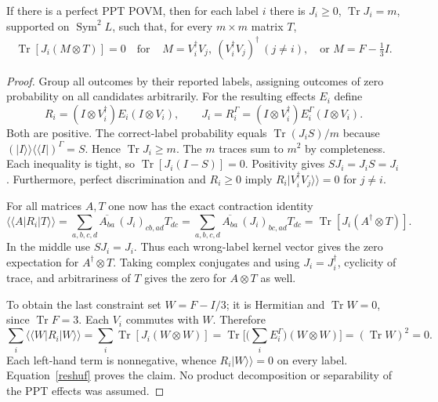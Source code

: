 \documentclass[10pt]{article}
\DeclareMathOperator{\Tr}{Tr}\DeclareMathOperator{\Sym}{Sym}
\begin{document}
\begin{lemma}\label{moment}If there is a perfect PPT POVM, then for each label $i$ there is $J_i\ge0$, $\Tr J_i=m$, supported on $\Sym^2 L$, such that, for every $m\times m$ matrix $T$,
\begin{align}
 \Tr[J_i(M\otimes T)]=0\quad\text{for }&
 M=V_i^\dagger V_j,\ (V_i^\dagger V_j)^\dagger\ (j\ne i),\quad
                 \text{or } M=F-\tfrac13 I . \label{momentconstraints}
\end{align}
\end{lemma}
\begin{proof}Group all outcomes by their reported labels, assigning outcomes of zero probability on all candidates arbitrarily. For the resulting effects $E_i$ define
\[
 R_i=(I\otimes V_i^\dagger)E_i(I\otimes V_i),\qquad
 J_i=R_i^\Gamma=(I\otimes V_i^\dagger)E_i^\Gamma(I\otimes V_i).
\]
Both are positive. The correct-label probability equals $\Tr(J_i S)/m$ because $(|I\rangle\!\rangle\langle\!\langle I|)^\Gamma=S$. Hence $\Tr J_i\ge m$. The $m$ traces sum to $m^2$ by completeness. Each inequality is tight, so $\Tr[J_i(I-S)]=0$. Positivity gives $SJ_i=J_iS=J_i$. Furthermore, perfect discrimination and $R_i\ge0$ imply $R_i|V_i^\dagger V_j\rangle\!\rangle=0$ for $j\ne i$.

For all matrices $A,T$ one now has the exact contraction identity
\begin{equation}
 \langle\!\langle A|R_i|T\rangle\!\rangle
   =\sum_{a,b,c,d}\overline{A_{ba}}\,(J_i)_{cb,ad} T_{dc}
   =\sum_{a,b,c,d}\overline{A_{ba}}\,(J_i)_{bc,ad} T_{dc}
   = \Tr[J_i(A^\dagger\otimes T)]. \label{reshuf}
\end{equation}
In the middle use $SJ_i=J_i$. Thus each wrong-label kernel vector gives the zero expectation for $A^\dagger\otimes T$. Taking complex conjugates and using $J_i=J_i^\dagger$, cyclicity of trace, and arbitrariness of $T$ gives the zero for $A\otimes T$ as well.

To obtain the last constraint set $W=F-I/3$; it is Hermitian and $\Tr W=0$, since $\Tr F=3$. Each $V_i$ commutes with $W$. Therefore
\[
 \sum_i\langle\!\langle W|R_i|W\rangle\!\rangle
 =\sum_i\Tr[J_i(W\otimes W)]
 =\Tr\Big[\Big(\sum_i E_i^\Gamma\Big)(W\otimes W)\Big]
 =(\Tr W)^2=0.
\]
Each left-hand term is nonnegative, whence $R_i|W\rangle\!\rangle=0$ on every label. Equation~\eqref{reshuf} proves the claim. No product decomposition or separability of the PPT effects was assumed.
\end{proof}
\end{document}
